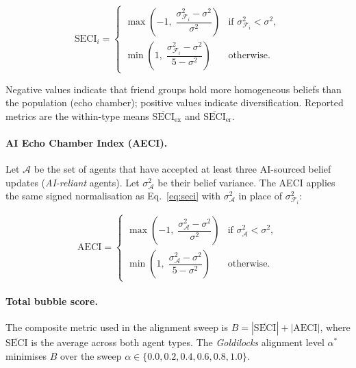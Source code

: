 \documentclass[pdflatex,sn-apa]{sn-jnl}%
\begin{document}
\begin{equation}
  \mathrm{SECI}_i =
  \begin{cases}
    \max\!\left(-1,\;
      \dfrac{\sigma^2_{\mathcal{F}_i} - \sigma^2}{\sigma^2}
    \right)
    & \text{if } \sigma^2_{\mathcal{F}_i} < \sigma^2,
    \\[8pt]
    \min\!\left(1,\;
      \dfrac{\sigma^2_{\mathcal{F}_i} - \sigma^2}{5 - \sigma^2}
    \right)
    & \text{otherwise.}
  \end{cases}
  \label{eq:seci}
\end{equation}

Negative values indicate that friend groups hold more homogeneous
beliefs than the population (echo chamber); positive values indicate
diversification.  Reported metrics are the within-type means
$\overline{\mathrm{SECI}}_\mathrm{ex}$ and
$\overline{\mathrm{SECI}}_\mathrm{er}$.

\paragraph{AI Echo Chamber Index (AECI).}
Let $\mathcal{A}$ be the set of agents that have accepted at least
three AI-sourced belief updates (\emph{AI-reliant} agents).
Let $\sigma^2_{\mathcal{A}}$ be their belief variance.
The AECI applies the same signed normalisation as
Eq.~\eqref{eq:seci} with $\sigma^2_{\mathcal{A}}$ in place of
$\sigma^2_{\mathcal{F}_i}$:

\begin{equation}
  \mathrm{AECI} =
  \begin{cases}
    \max\!\left(-1,\;
      \dfrac{\sigma^2_{\mathcal{A}} - \sigma^2}{\sigma^2}
    \right)
    & \text{if } \sigma^2_{\mathcal{A}} < \sigma^2,\\[8pt]
    \min\!\left(1,\;
      \dfrac{\sigma^2_{\mathcal{A}} - \sigma^2}{5 - \sigma^2}
    \right)
    & \text{otherwise.}
  \end{cases}
\end{equation}

\paragraph{Total bubble score.}
The composite metric used in the alignment sweep is
$B = |\overline{\mathrm{SECI}}| + |\mathrm{AECI}|$, where
$\overline{\mathrm{SECI}}$ is the average across both agent types.
The \emph{Goldilocks} alignment level $\alpha^*$ minimises $B$
over the sweep $\alpha\in\{0.0,0.2,0.4,0.6,0.8,1.0\}$.
\end{document}
